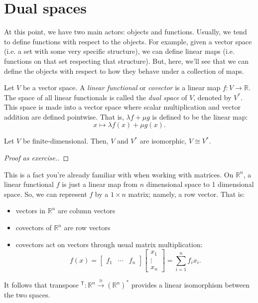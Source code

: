 \section{Dual spaces}
At this point, we have two main actors: objects and functions. Usually, we tend to define functions with respect to the objects. For example, given a vector space (i.e. a set with some very specific structure), we can define linear maps (i.e. functions on that set respecting that structure). But, here, we'll see that we can define the objects with respect to how they behave under a collection of maps.

\begin{definition}
Let $V$ be a vector space. A \emph{linear functional} or \emph{covector} is a linear map $f: V \to \mathbb{R}$. The space of all linear functionals is called the \emph{dual space} of $V$, denoted by $V^*$. This space is made into a vector space where scalar multiplication and vector addition are defined pointwise. That is, $\lambda f + \mu g$ is defined to be the linear map:
\[x \mapsto \lambda f(x) + \mu g(x).\]
\end{definition}

\begin{proposition}
Let $V$ be finite-dimensional. Then, $V$ and $V^*$ are isomorphic, $V \cong V^*$.
\end{proposition}
\begin{proof}[Proof as exercise.]
\end{proof}

This is a fact you're already familiar with when working with matrices. On $\mathbb{R}^n$, a linear functional $f$ is just a linear map from $n$ dimensional space to 1 dimensional space. So, we can represent $f$ by a $1 \times n$ matrix; namely, a row vector. That is:
\begin{itemize}
    \item vectors in $\mathbb{R}^n$ are column vectors
    \item covectors of $\mathbb{R}^n$ are row vectors
    \item covectors act on vectors through usual matrix multiplication:
    \[f(x) = \begin{bmatrix} f_1 & \dotsm & f_n \end{bmatrix} \begin{bmatrix} x_1 \\ \vdots \\ x_n \end{bmatrix} = \sum_{i=1}^n f_i x_i.\]
\end{itemize}
It follows that transpose $ ^\mathsf{T}: \mathbb{R}^n \overset{\cong}{\longrightarrow} (\mathbb{R}^n)^*$ provides a linear isomorphism between the two spaces.

